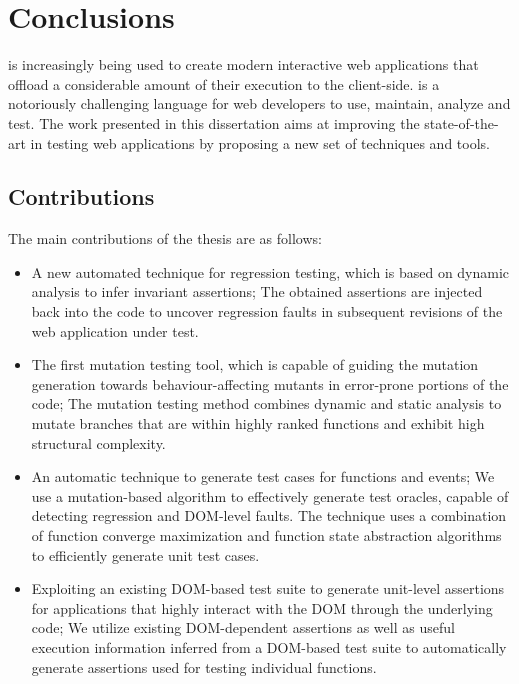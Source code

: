 \chapter{Conclusions} \label{Chap:conc}
\javascript is increasingly being used to create modern interactive web applications that offload a considerable amount of their execution to the client-side. \javascript is a notoriously challenging language for web developers to use, maintain, analyze and test. %
The work presented in this dissertation aims at improving the state-of-the-art in testing \javascript web applications by proposing a new set of techniques and tools.
\section{Contributions}
The main contributions of the thesis are as follows: 
\begin{itemize}
\item A new automated technique for \javascript regression testing, which is based on dynamic analysis to infer invariant assertions; The obtained assertions are injected back into the \javascript code to uncover regression faults in subsequent revisions of the web application under test. 
\item The first \javascript mutation testing tool, which is capable of guiding the mutation generation towards behaviour-affecting mutants in error-prone portions of the code; The mutation testing method combines dynamic and static analysis to mutate branches that are within highly ranked functions and exhibit high structural complexity.
\item An automatic technique to generate test cases for \javascript functions and events; We use a mutation-based algorithm to effectively generate test oracles, capable of detecting regression \javascript and DOM-level faults. The technique uses a combination of function converge maximization and function state abstraction algorithms to efficiently generate unit test cases.
\item Exploiting an existing DOM-based test suite to generate unit-level assertions for applications that highly interact with the DOM through the underlying \javascript code; We utilize
existing DOM-dependent assertions as well as useful execution information inferred from a DOM-based test suite to automatically generate assertions used for testing individual \javascript functions.
\end{itemize}
